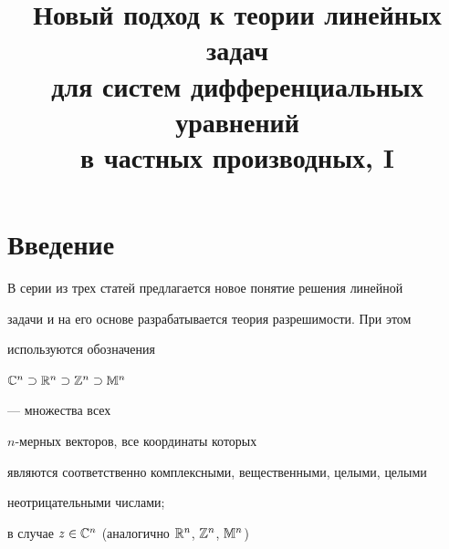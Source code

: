 \title{Новый подход к теории линейных задач\\ 


для систем дифференциальных уравнений\\ 


в частных производных, I} 


 


\date{} 




 


\pagestyle{plain} %


 


 




 


\maketitle 


\label{begin} 


 


\section*{Введение} 


 


В серии из трех статей предлагается новое понятие решения линейной 


задачи и на его основе разрабатывается теория разрешимости. При этом 


используются обозначения 


 


$\Bbb C^n\supset\Bbb R^n\supset\Bbb Z^n\supset\Bbb M^n$ 


--- множества всех 


$n$-мерных векторов, все координаты которых 


являются соответственно комплексными, вещественными, целыми, целыми 


неотрицательными числами; 


 


в случае $z\in\Bbb C^n$ (аналогично $\Bbb R^n$, $\Bbb Z^n$, $\Bbb M^n$) 



